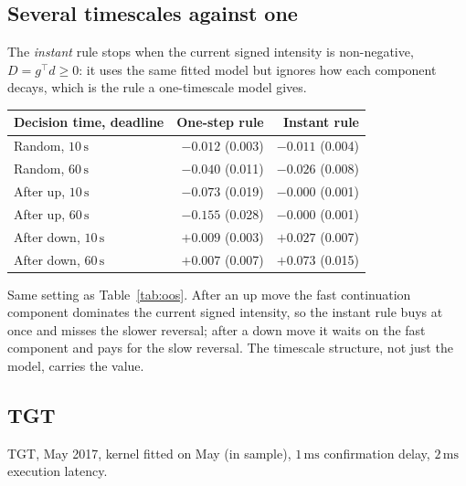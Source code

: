 \documentclass[11pt]{article}
\theoremstyle{definition}
\theoremstyle{remark}
\newcommand{\ms}{\,\text{ms}}
\newcommand{\sx}{\,\text{s}}
\begin{document}
\subsection{Several timescales against one}
\label{sec:res-instant}

The \emph{instant} rule stops when the current signed intensity is non-negative, $D = g^\top d \ge 0$: it uses the same fitted model but ignores how each component decays, which is the rule a one-timescale model gives.

\begin{center}
\small
\begin{tabular}{@{}lrr@{}}
\toprule
Decision time, deadline & One-step rule & Instant rule \\
\midrule
Random, $10\sx$ & $-0.012$ (0.003) & $-0.011$ (0.004) \\
Random, $60\sx$ & $-0.040$ (0.011) & $-0.026$ (0.008) \\
After up, $10\sx$ & $-0.073$ (0.019) & $-0.000$ (0.001) \\
After up, $60\sx$ & $-0.155$ (0.028) & $-0.000$ (0.001) \\
After down, $10\sx$ & $+0.009$ (0.003) & $+0.027$ (0.007) \\
After down, $60\sx$ & $+0.007$ (0.007) & $+0.073$ (0.015) \\
\bottomrule
\end{tabular}
\end{center}

\noindent Same setting as Table~\ref{tab:oos}. After an up move the fast continuation component dominates the current signed intensity, so the instant rule buys at once and misses the slower reversal; after a down move it waits on the fast component and pays for the slow reversal. The timescale structure, not just the model, carries the value.

\subsection{TGT}

TGT, May 2017, kernel fitted on May (in sample), $1\ms$ confirmation delay, $2\ms$ execution latency.
\end{document}
